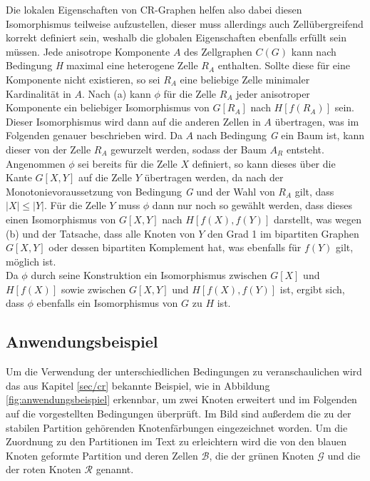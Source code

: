 Die lokalen Eigenschaften von CR-Graphen helfen also dabei diesen Isomorphismus teilweise aufzustellen, dieser muss allerdings auch Zellübergreifend korrekt definiert sein, weshalb die globalen Eigenschaften ebenfalls erfüllt sein müssen.
Jede anisotrope Komponente $A$ des Zellgraphen $C(G)$ kann nach Bedingung \emph{H} maximal eine heterogene Zelle $R_A$ enthalten.
Sollte diese für eine Komponente nicht existieren, so sei $R_A$ eine beliebige Zelle minimaler Kardinalität in $A$.
Nach (a) kann $\phi$ für die Zelle $R_A$ jeder anisotroper Komponente ein beliebiger Isomorphismus von $G[R_A]$ nach $H[f(R_A)]$ sein.
Dieser Isomorphismus wird dann auf die anderen Zellen in $A$ übertragen, was im Folgenden genauer beschrieben wird.
Da $A$ nach Bedingung \emph{G} ein Baum ist, kann dieser von der Zelle $R_A$ gewurzelt werden, sodass der Baum $A_R$ entsteht.
Angenommen $\phi$ sei bereits für die Zelle $X$ definiert, so kann dieses über die Kante $G[X,Y]$ auf die Zelle $Y$ übertragen werden, da nach der Monotonievoraussetzung von Bedingung \emph{G} und der Wahl von $R_A$ gilt, dass $|X|\leq |Y|$.
Für die Zelle $Y$ muss $\phi$ dann nur noch so gewählt werden, dass dieses einen Isomorphismus von $G[X,Y]$ nach $H[f(X),f(Y)]$ darstellt, was wegen (b) und der Tatsache, dass alle Knoten von $Y$ den Grad 1 im bipartiten Graphen $G[X,Y]$ oder dessen bipartiten Komplement hat, was ebenfalls für $f(Y)$ gilt, möglich ist.\\

Da $\phi$ durch seine Konstruktion ein Isomorphismus zwischen $G[X]$ und $H[f(X)]$ sowie zwischen $G[X,Y]$ und $H[f(X),f(Y)]$ ist, ergibt sich, dass $\phi$ ebenfalls ein Isomorphismus von $G$ zu $H$ ist.

\subsection{Anwendungsbeispiel}
\label{sec/anwendungsbeispiel}
Um die Verwendung der unterschiedlichen Bedingungen zu veranschaulichen wird das aus Kapitel \ref{sec/cr} bekannte Beispiel, wie in Abbildung \ref{fig:anwendungsbeispiel} erkennbar, um zwei Knoten erweitert und im Folgenden auf die vorgestellten Bedingungen überprüft.
Im Bild sind außerdem die zu der stabilen Partition gehörenden Knotenfärbungen eingezeichnet worden.
Um die Zuordnung zu den Partitionen im Text zu erleichtern wird die von den blauen Knoten geformte Partition und deren Zellen $\mathcal{B}$, die der grünen Knoten $\mathcal{G}$ und die der roten Knoten $\mathcal{R}$ genannt.

